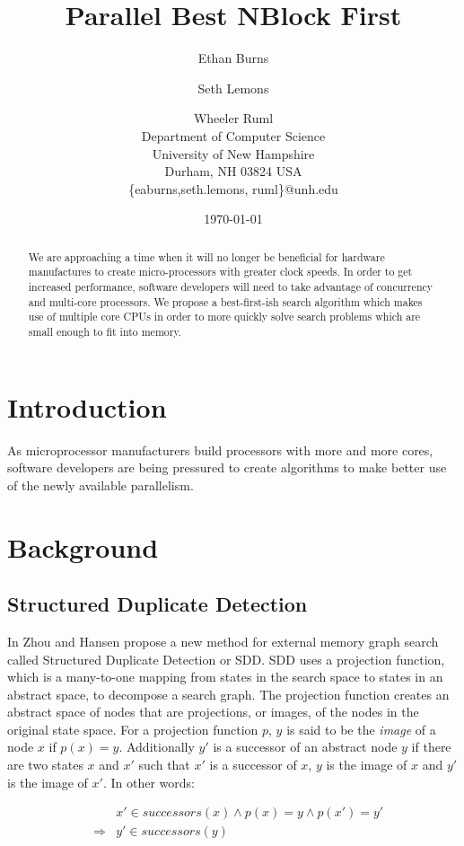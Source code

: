\documentclass{article} \usepackage{aaai} \usepackage{graphicx}
\title{Parallel Best NBlock First}
\author{Ethan Burns \and Seth Lemons \and Wheeler Ruml \\
Department of Computer Science \\
University of New Hampshire \\
Durham, NH 03824 USA \\
\{eaburns,seth.lemons, ruml\}@unh.edu}
\date{\today}
\begin{document}
\maketitle

\begin{abstract}
We are approaching a time when it will no longer be beneficial for
hardware manufactures to create micro-processors with greater clock
speeds.  In order to get increased performance, software developers
will need to take advantage of concurrency and multi-core processors.
We propose a best-first-ish search algorithm which makes use of
multiple core CPUs in order to more quickly solve search problems
which are small enough to fit into memory.
\end{abstract}

\section{Introduction}

As microprocessor manufacturers build processors with more and more
cores, software developers are being pressured to create algorithms to
make better use of the newly available parallelism.

\section{Background}

\subsection{Structured Duplicate Detection}

In \cite{zhou:sdd} Zhou and Hansen propose a new method for external
memory graph search called Structured Duplicate Detection or SDD.  SDD
uses a projection function, which is a many-to-one mapping from states
in the search space to states in an abstract space, to decompose a
search graph.  The projection function creates an abstract space of
nodes that are projections, or images, of the nodes in the original
state space.  For a projection function $p$, $y$ is said to be the
\emph{image} of a node $x$ if $p(x) = y$.  Additionally $y'$ is a
successor of an abstract node $y$ if there are two states $x$ and $x'$
such that $x'$ is a successor of $x$, $y$ is the image of $x$ and $y'$
is the image of $x'$.  In other words:

\begin{eqnarray*}
&&x' \in successors(x) \wedge p(x) = y \wedge p(x') = y' \\
&\Rightarrow& y' \in successors(y)
\end{eqnarray*}
\end{document}
